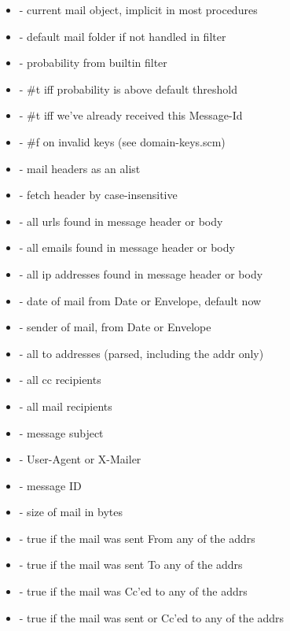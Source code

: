 \begin{itemize}
\item {}   - current mail object, implicit in most procedures
\item {} - default mail folder if not handled in filter

\item {}  - probability from builtin filter
\item {}          - #t iff probability is above default threshold
\item {}     - #t iff we've already received this Message-Id

\item {}  - #f on invalid keys (see domain-keys.scm)

\item {}       -  mail headers as an alist
\item {} -  fetch header by case-insensitive 

\item {}   - all urls found in message header or body
\item {} - all emails found in message header or body
\item {}    - all ip addresses found in message header or body


\item {}            -  date of mail from Date or Envelope, default now
\item {}            -  sender of mail, from Date or Envelope
\item {}              -  all to addresses (parsed, including the addr only)
\item {}              -  all cc recipients
\item {}           -  all mail recipients
\item {}         -  message subject
\item {}          -  User-Agent or X-Mailer
\item {}      -  message ID
\item {}  -  size of mail in bytes

\item {}  - true if the mail was sent From any of the addrs
\item {}  - true if the mail was sent To any of the addrs
\item {}  - true if the mail was Cc'ed to any of the addrs
\item {}  - true if the mail was sent or Cc'ed to any of the addrs


\end{itemize}
